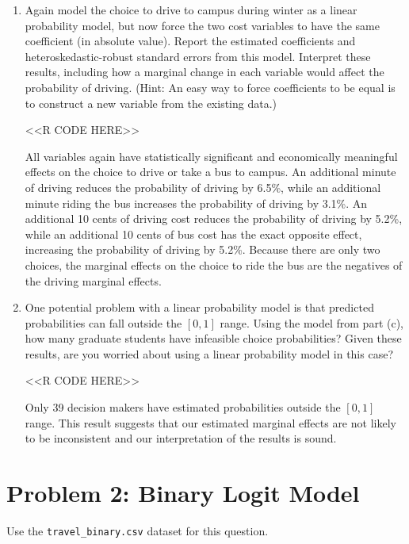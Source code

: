 \documentclass[11pt,letterpaper]{article}
\begin{document}
\begin{enumerate}[label=\alph*., leftmargin=*]
	\item Again model the choice to drive to campus during winter as a linear probability model, but now force the two cost variables to have the same coefficient (in absolute value). Report the estimated coefficients and heteroskedastic-robust standard errors from this model. Interpret these results, including how a marginal change in each variable would affect the probability of driving. (Hint: An easy way to force coefficients to be equal is to construct a new variable from the existing data.)

	<<R CODE HERE>>

	All variables again have statistically significant and economically meaningful effects on the choice to drive or take a bus to campus. An additional minute of driving reduces the probability of driving by 6.5\%, while an additional minute riding the bus increases the probability of driving by 3.1\%. An additional 10 cents of driving cost reduces the probability of driving by 5.2\%, while an additional 10 cents of bus cost has the exact opposite effect, increasing the probability of driving by 5.2\%. Because there are only two choices, the marginal effects on the choice to ride the bus are the negatives of the driving marginal effects.
	
	\item One potential problem with a linear probability model is that predicted probabilities can fall outside the $[0, 1]$ range. Using the model from part (c), how many graduate students have infeasible choice probabilities? Given these results, are you worried about using a linear probability model in this case?

	<<R CODE HERE>>

	Only 39 decision makers have estimated probabilities outside the $[0, 1]$ range. This result suggests that our estimated marginal effects are not likely to be inconsistent and our interpretation of the results is sound.
\end{enumerate}

\section*{Problem 2: Binary Logit Model}

Use the \texttt{travel\_binary.csv} dataset for this question.
\end{document}
